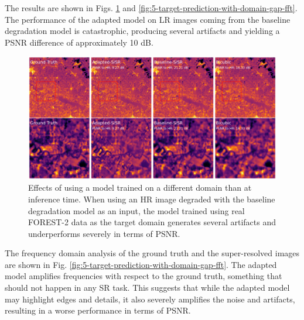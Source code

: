         The results are shown in Figs. \ref{fig:5-target-prediction-with-domain-gap} and \ref{fig:5-target-prediction-with-domain-gap-fft}.
        The performance of the adapted model on LR images coming from the baseline degradation model is catastrophic, producing several artifacts and yielding a PSNR difference of approximately 10 dB.

        \begin{figure}[H]
            \centering
            \includegraphics[scale=0.28]{Includes/5-target_prediction_sample-with-domain-gap.pdf}
            \caption{Effects of using a model trained on a different domain than at inference time. 
                     When using an HR image degraded with the baseline degradation model as an input, the model trained using real FOREST-2 data as the target domain generates several artifacts and underperforms severely in terms of PSNR. }
            \label{fig:5-target-prediction-with-domain-gap}
        \end{figure}

        The frequency domain analysis of the ground truth and the super-resolved images are shown in Fig. \ref{fig:5-target-prediction-with-domain-gap-fft}.  
        The adapted model amplifies frequencies with respect to the ground truth, something that should not happen in any SR task. 
        This suggests that while the adapted model may highlight edges and details, it also severely amplifies the noise and artifacts, resulting in a worse performance in terms of PSNR.
        

